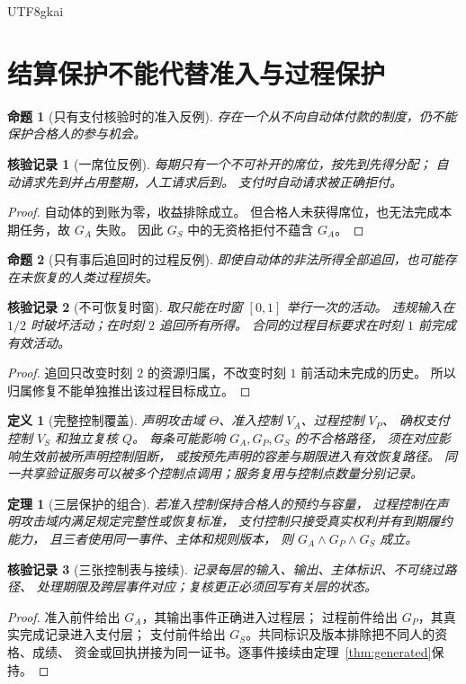 \documentclass[12pt,a4paper,openany]{report}
\newtheorem{definition}{定义}[chapter]
\newtheorem{theorem}{定理}[chapter]
\newtheorem{proposition}{命题}[chapter]
\newtheorem{Certificate}{核验记录}[chapter]
\begin{document}
\begin{CJK*}{UTF8}{gkai}
\section{结算保护不能代替准入与过程保护}
\begin{proposition}[只有支付核验时的准入反例]
\label{prop:admission-counterexample}
存在一个从不向自动体付款的制度，仍不能保护合格人的参与机会。
\end{proposition}
\begin{Certificate}[一席位反例]
每期只有一个不可补开的席位，按先到先得分配；
自动请求先到并占用整期，人工请求后到。
支付时自动请求被正确拒付。
\end{Certificate}
\begin{proof}
自动体的到账为零，收益排除成立。
但合格人未获得席位，也无法完成本期任务，故 \(G_A\) 失败。
因此 \(G_S\) 中的无资格拒付不蕴含 \(G_A\)。
\end{proof}

\begin{proposition}[只有事后追回时的过程反例]
\label{prop:process-counterexample}
即使自动体的非法所得全部追回，也可能存在未恢复的人类过程损失。
\end{proposition}
\begin{Certificate}[不可恢复时窗]
取只能在时窗 \([0,1]\) 举行一次的活动。
违规输入在 \(1/2\) 时破坏活动；在时刻 \(2\) 追回所有所得。
合同的过程目标要求在时刻 \(1\) 前完成有效活动。
\end{Certificate}
\begin{proof}
追回只改变时刻 \(2\) 的资源归属，不改变时刻 \(1\) 前活动未完成的历史。
所以归属修复不能单独推出该过程目标成立。
\end{proof}

\begin{definition}[完整控制覆盖]
\label{def:coverage}
声明攻击域 \(\Theta\)、准入控制 \(V_A\)、过程控制 \(V_P\)、
确权支付控制 \(V_S\) 和独立复核 \(Q\)。
每条可能影响 \(G_A,G_P,G_S\) 的不合格路径，
须在对应影响生效前被所声明控制阻断，
或按预先声明的容差与期限进入有效恢复路径。
同一共享验证服务可以被多个控制点调用；服务复用与控制点数量分别记录。
\end{definition}

\begin{theorem}[三层保护的组合]
\label{thm:three-protection}
若准入控制保持合格人的预约与容量，
过程控制在声明攻击域内满足规定完整性或恢复标准，
支付控制只接受真实权利并有到期履约能力，
且三者使用同一事件、主体和规则版本，
则 \(G_A\land G_P\land G_S\) 成立。
\end{theorem}
\begin{Certificate}[三张控制表与接续]
记录每层的输入、输出、主体标识、不可绕过路径、
处理期限及跨层事件对应；复核更正必须回写有关层的状态。
\end{Certificate}
\begin{proof}
准入前件给出 \(G_A\)，其输出事件正确进入过程层；
过程前件给出 \(G_P\)，其真实完成记录进入支付层；
支付前件给出 \(G_S\)。共同标识及版本排除把不同人的资格、成绩、
资金或回执拼接为同一证书。逐事件接续由定理~\ref{thm:generated}保持。
\end{proof}


\end{CJK*}
\end{document}
